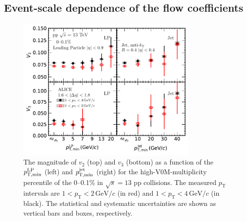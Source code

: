 \subsection{Event-scale dependence of the flow coefficients}
\begin{figure}[h!]
	\centering
	\hspace{-3em}\includegraphics[width=0.8\textwidth]{figures/Fig4_vn_LP.pdf}
	\caption{The magnitude of $v_2$ (top) and $v_3$ (bottom) as a function of the $\it{p}^{\rm{LP}}_{\rm{T,min}}$ (left) and $\it{p}^{\rm{jet}}_{\rm{T,min}}$ (right) for the high-V0M-multiplicity percentile of the 0--0.1\% in $\sqrt{s}=13$ pp collisions. The measured $p_{\mathrm{T}}$ intervals are $1<p_{\mathrm{T}}<2\,\mathrm{GeV}/c$ (in red) and $1<p_{\mathrm{T}}<4\,\mathrm{GeV}/c$ (in black). The statistical and systematic uncertainties are shown as vertical bars and boxes, respectively.}
	\label{fig:LPjet23}
\end{figure}    

